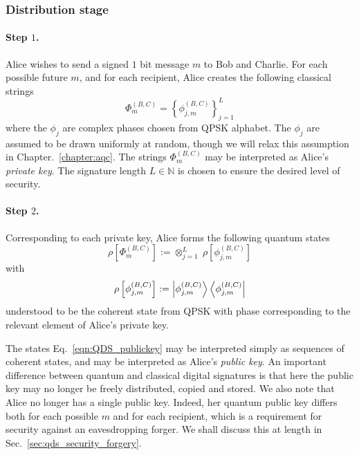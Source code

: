 
\subsubsection{Distribution stage}

\paragraph{Step $1$.}
Alice wishes to send a signed $1$ bit message $m$ to Bob and Charlie. For each possible future $m$, and for each recipient, Alice creates the following classical strings
\begin{equation}
\Phi_m^{\left(B, C\right)} = \left\{ \phi_{j, m}^{\left(B, C\right)}\right\}_{j=1}^{L}
\end{equation}
where the $\phi_{j}$ are complex phases chosen from QPSK alphabet. The $\phi_j$ are assumed to be drawn uniformly at random, though we will relax this assumption in Chapter.~\ref{chapter:aqc}. The strings $\Phi_m^{\left(B, C\right)}$ may be interpreted as Alice's \emph{private key}. The signature length $L \in \mathbb{N}$ is chosen to ensure the desired level of security.

\paragraph{Step $2$.} Corresponding to each private key, Alice forms the following quantum states
\begin{equation}\label{eqn:QDS_publickey}
\rho\left[\Phi_m^{\left(B, C\right)}\right] := \otimes_{j=1}^L \; \rho\left[\phi_{j, m}^{\left(B, C\right)}\right]
\end{equation}
with
\begin{equation}
\rho\left[\phi_{j, m}^{\left(B, C\right)}\right] := \ket{\phi_{j, m}^{\left(B, C\right)}} \bra{\phi_{j, m}^{\left(B, C\right)}} \notag
\end{equation}
understood to be the coherent state from QPSK with phase corresponding to the relevant element of Alice's private key.

The states Eq.~\ref{eqn:QDS_publickey} may be interpreted simply as sequences of coherent states, and may be interpreted as Alice's \emph{public key}. An important difference between quantum and classical digital signatures is that here the public key may no longer be freely distributed, copied and stored. We also note that Alice no longer has a single public key. Indeed, her quantum public key differs both for each possible $m$ and for each recipient, which is a requirement for security against an eavesdropping forger. We shall discuss this at length in Sec.~\ref{sec:qds_security_forgery}.
